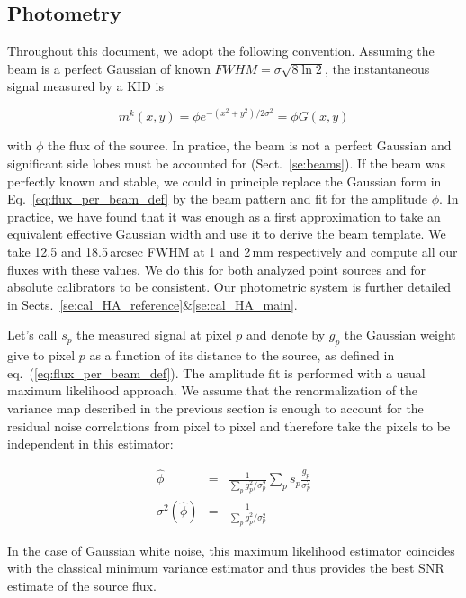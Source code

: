 \subsection{Photometry}
\label{se:intro_photometry}

Throughout this document, we adopt the following convention. Assuming the beam
is a perfect Gaussian of known $FWHM=\sigma\sqrt{8\ln 2}$, the instantaneous
signal measured by a KID is

\begin{equation}
m^k(x,y) = \phi e^{-(x^2+y^2)/2\sigma^2} = \phi G(x,y)
\label{eq:flux_per_beam_def}
\end{equation}

with $\phi$ the flux of the source. In pratice, the beam is not a perfect
Gaussian and significant side lobes must be accounted for
(Sect.~\ref{se:beams}). If the beam was perfectly known and stable, we could in
principle replace the Gaussian form in Eq.~\ref{eq:flux_per_beam_def} by the
beam pattern and fit for the amplitude $\phi$. In practice, we have found that
it was enough as a first approximation to take an equivalent effective Gaussian
width and use it to derive the beam template. We take 12.5 and 18.5\,arcsec FWHM
at 1 and 2\,mm respectively and compute all our fluxes with these
values. We do this for both analyzed point sources and for absolute calibrators
to be consistent. Our photometric system is further detailed in
Sects.~\ref{se:cal_HA_reference}$\&$\ref{se:cal_HA_main}. 

Let's call $s_p$ the measured signal at pixel $p$ and denote by $g_p$ the
Gaussian weight give to pixel $p$ as a function of its distance to the source,
as defined in eq.~(\ref{eq:flux_per_beam_def}). The amplitude fit is performed
with a usual maximum likelihood approach. We assume that the renormalization of
the variance map described in the previous section is enough to account for the
residual noise correlations from pixel to pixel and therefore take the pixels to
be independent in this estimator:

\begin{eqnarray}
\hat{\phi} &=& \frac{1}{\sum_p g_p^2/\sigma_p^2}\sum_p
s_p\frac{g_p}{\sigma_p^2} \label{eq:flux_estim_def} \\
\sigma^2(\hat{\phi}) &=& \frac{1}{\sum_p
  g_p^2/\sigma_p^2} \label{eq:flux_estim_var_def}
\end{eqnarray}

In the case of Gaussian white noise, this maximum likelihood estimator coincides
with the classical minimum variance estimator and thus provides the best SNR
estimate of the source flux.

